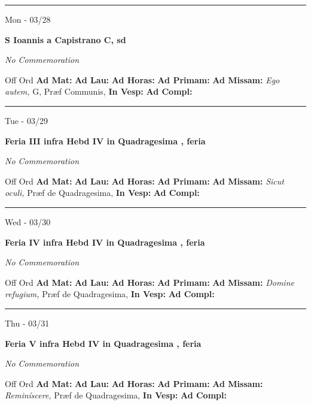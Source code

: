 \documentclass[letterpaper, 10pt]{article}
\begin{document}
\hrule
\begin{center}
Mon - 03/28
\end{center}\textbf{ \large S Ioannis a Capistrano C, \textnormal{\normalsize sd}}

\textit{No Commemoration}\begin{justify}
Off Ord
\textbf{Ad Mat: }
\textbf{Ad Lau: }
\textbf{Ad Horas: }
\textbf{Ad Primam: }
\textbf{Ad Missam:} \textit{Ego autem, } G, Præf Communis, 
\textbf{In Vesp: }
\textbf{Ad Compl: }\end{justify}



\hrule
\begin{center}
Tue - 03/29
\end{center}\textbf{ \large Feria III infra Hebd IV in Quadragesima , \textnormal{\normalsize feria}}

\textit{No Commemoration}\begin{justify}
Off Ord
\textbf{Ad Mat: }
\textbf{Ad Lau: }
\textbf{Ad Horas: }
\textbf{Ad Primam: }
\textbf{Ad Missam:} \textit{Sicut oculi, } Præf de Quadragesima, 
\textbf{In Vesp: }
\textbf{Ad Compl: }\end{justify}



\hrule
\begin{center}
Wed - 03/30
\end{center}\textbf{ \large Feria IV infra Hebd IV in Quadragesima , \textnormal{\normalsize feria}}

\textit{No Commemoration}\begin{justify}
Off Ord
\textbf{Ad Mat: }
\textbf{Ad Lau: }
\textbf{Ad Horas: }
\textbf{Ad Primam: }
\textbf{Ad Missam:} \textit{Domine refugium, } Præf de Quadragesima, 
\textbf{In Vesp: }
\textbf{Ad Compl: }\end{justify}



\hrule
\begin{center}
Thu - 03/31
\end{center}\textbf{ \large Feria V infra Hebd IV in Quadragesima , \textnormal{\normalsize feria}}

\textit{No Commemoration}\begin{justify}
Off Ord
\textbf{Ad Mat: }
\textbf{Ad Lau: }
\textbf{Ad Horas: }
\textbf{Ad Primam: }
\textbf{Ad Missam:} \textit{Reminíscere, } Præf de Quadragesima, 
\textbf{In Vesp: }
\textbf{Ad Compl: }\end{justify}
\end{document}
